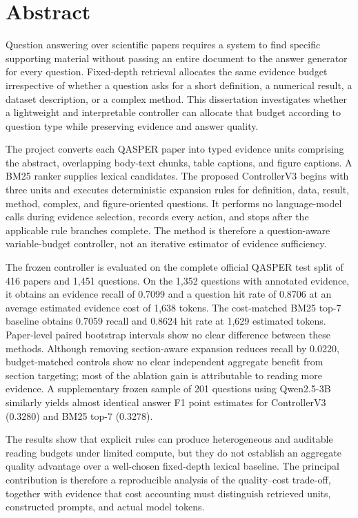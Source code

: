 \chapter*{Abstract}

Question answering over scientific papers requires a system to find specific supporting material without passing an entire document to the answer generator for every question. Fixed-depth retrieval allocates the same evidence budget irrespective of whether a question asks for a short definition, a numerical result, a dataset description, or a complex method. This dissertation investigates whether a lightweight and interpretable controller can allocate that budget according to question type while preserving evidence and answer quality.

The project converts each QASPER paper into typed evidence units comprising the abstract, overlapping body-text chunks, table captions, and figure captions. A BM25 ranker supplies lexical candidates. The proposed ControllerV3 begins with three units and executes deterministic expansion rules for definition, data, result, method, complex, and figure-oriented questions. It performs no language-model calls during evidence selection, records every action, and stops after the applicable rule branches complete. The method is therefore a question-aware variable-budget controller, not an iterative estimator of evidence sufficiency.

The frozen controller is evaluated on the complete official QASPER test split of 416 papers and 1,451 questions. On the 1,352 questions with annotated evidence, it obtains an evidence recall of 0.7099 and a question hit rate of 0.8706 at an average estimated evidence cost of 1,638 tokens. The cost-matched BM25 top-7 baseline obtains 0.7059 recall and 0.8624 hit rate at 1,629 estimated tokens. Paper-level paired bootstrap intervals show no clear difference between these methods. Although removing section-aware expansion reduces recall by 0.0220, budget-matched controls show no clear independent aggregate benefit from section targeting; most of the ablation gain is attributable to reading more evidence. A supplementary frozen sample of 201 questions using Qwen2.5-3B similarly yields almost identical answer F1 point estimates for ControllerV3 (0.3280) and BM25 top-7 (0.3278).

The results show that explicit rules can produce heterogeneous and auditable reading budgets under limited compute, but they do not establish an aggregate quality advantage over a well-chosen fixed-depth lexical baseline. The principal contribution is therefore a reproducible analysis of the quality--cost trade-off, together with evidence that cost accounting must distinguish retrieved units, constructed prompts, and actual model tokens.

